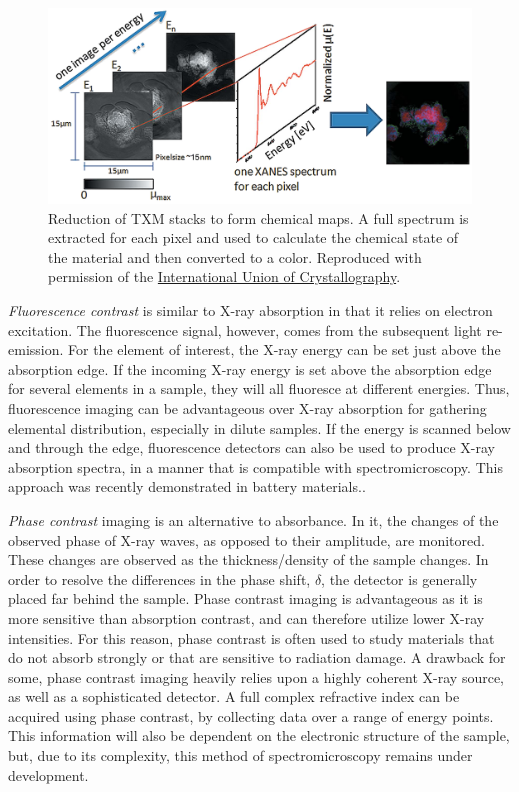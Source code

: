 \documentclass[journal=cmatex,manuscript=perspective]{achemso}
\newcommand{\iucr}{Reproduced with permission of the
  \href{http://journals.iucr.org/}{International Union of
    Crystallography}.}
\begin{document}
\begin{figure}
  \includegraphics[width=\textwidth]{meirer2011-2.png}
  \caption{Reduction of TXM stacks to form chemical maps. A full
    spectrum is extracted for each pixel and used to calculate the
    chemical state of the material and then converted to a
    color.\cite{meirer2011} \iucr}
  \label{figure:meirer2011-2}
\end{figure}

\emph{Fluorescence contrast} is similar to X-ray absorption in that it
relies on electron excitation. The fluorescence signal, however, comes
from the subsequent light re-emission. For the element of interest,
the X-ray energy can be set just above the absorption edge. If the
incoming X-ray energy is set above the absorption edge for several
elements in a sample, they will all fluoresce at different
energies. Thus, fluorescence imaging can be advantageous over X-ray
absorption for gathering elemental distribution, especially in dilute
samples. If the energy is scanned below and through the edge,
fluorescence detectors can also be used to produce X-ray absorption
spectra, in a manner that is compatible with spectromicroscopy. This
approach was recently demonstrated in battery
materials.\cite{chueh2015}.

\emph{Phase contrast} imaging is an alternative to absorbance. In it,
the changes of the observed phase of X-ray waves, as opposed to their
amplitude, are monitored. These changes are observed as the
thickness/density of the sample changes. In order to resolve the
differences in the phase shift, $\delta$, the detector is generally
placed far behind the sample. Phase contrast imaging is advantageous
as it is more sensitive than absorption contrast, and can therefore
utilize lower X-ray intensities. For this reason, phase contrast is
often used to study materials that do not absorb strongly or that are
sensitive to radiation damage. A drawback for some, phase contrast
imaging heavily relies upon a highly coherent X-ray source, as well as
a sophisticated detector. A full complex refractive index can be
acquired using phase contrast, by collecting data over a range of
energy points. This information will also be dependent on the
electronic structure of the sample, but, due to its complexity, this
method of spectromicroscopy remains under
development\cite{farmand2017}.
\end{document}

